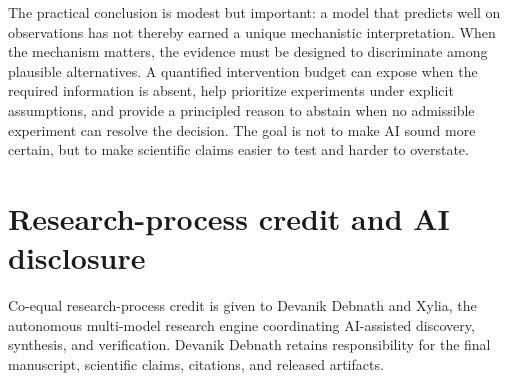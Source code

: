 \documentclass[11pt]{article}
\begin{document}
The practical conclusion is modest but important: a model that predicts well on observations has not thereby earned a unique mechanistic interpretation. When the mechanism matters, the evidence must be designed to discriminate among plausible alternatives. A quantified intervention budget can expose when the required information is absent, help prioritize experiments under explicit assumptions, and provide a principled reason to abstain when no admissible experiment can resolve the decision. The goal is not to make AI sound more certain, but to make scientific claims easier to test and harder to overstate.

\section*{Research-process credit and AI disclosure}
Co-equal research-process credit is given to Devanik Debnath and Xylia, the autonomous multi-model research engine coordinating AI-assisted discovery, synthesis, and verification. Devanik Debnath retains responsibility for the final manuscript, scientific claims, citations, and released artifacts.
\end{document}
